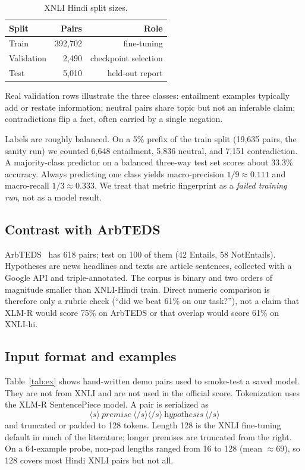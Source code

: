\documentclass[conference]{IEEEtran}
\begin{document}
\begin{table}[!t]
\centering
\caption{XNLI Hindi split sizes.}
\label{tab:splits}
\begin{tabular}{@{}lrr@{}}
\toprule
\textbf{Split} & \textbf{Pairs} & \textbf{Role} \\
\midrule
Train      & 392{,}702 & fine-tuning \\
Validation & 2{,}490   & checkpoint selection \\
Test       & 5{,}010   & held-out report \\
\bottomrule
\end{tabular}
\end{table}

Real validation rows illustrate the three classes: entailment examples typically add or restate information; neutral pairs share topic but not an inferable claim; contradictions flip a fact, often carried by a single negation.

Labels are roughly balanced. On a 5\% prefix of the train split (19{,}635 pairs, the sanity run) we counted 6{,}648 entailment, 5{,}836 neutral, and 7{,}151 contradiction. A majority-class predictor on a balanced three-way test set scores about 33.3\% accuracy. Always predicting one class yields macro-precision $1/9 \approx 0.111$ and macro-recall $1/3 \approx 0.333$. We treat that metric fingerprint as a \emph{failed training run}, not as a model result.

\subsection{Contrast with ArbTEDS}
ArbTEDS~\citep{alabbas2013dataset} has 618 pairs; \citet{khader2016textual} test on 100 of them (42 Entails, 58 NotEntails). Hypotheses are news headlines and texts are article sentences, collected with a Google API and triple-annotated. The corpus is binary and two orders of magnitude smaller than XNLI-Hindi train. Direct numeric comparison is therefore only a rubric check (``did we beat 61\% on our task?''), not a claim that XLM-R would score 75\% on ArbTEDS or that overlap would score 61\% on XNLI-hi.

\subsection{Input format and examples}
Table~\ref{tab:ex} shows hand-written demo pairs used to smoke-test a saved model. They are not from XNLI and are not used in the official score. Tokenization uses the XLM-R SentencePiece model. A pair is serialized as
\[
\langle s\rangle\ \textit{premise}\ \langle/s\rangle\langle/s\rangle\ \textit{hypothesis}\ \langle/s\rangle
\]
and truncated or padded to 128 tokens. Length 128 is the XNLI fine-tuning default in much of the literature; longer premises are truncated from the right. On a 64-example probe, non-pad lengths ranged from 16 to 128 (mean $\approx 69$), so 128 covers most Hindi XNLI pairs but not all.
\end{document}
